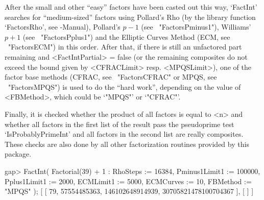 After the small and other ``easy'' factors have been casted out 
this way, `FactInt' searches for ``medium-sized'' factors using
Pollard's Rho (by the library function `FactorsRho',
see {\GAP}-Manual),
Pollard's $p-1$ (see ~"FactorsPminus1"), Williams' $p+1$ 
(see ~"FactorsPplus1") and the Elliptic Curves Method 
(ECM, see ~"FactorsECM") in this order.
After that, if there is still an unfactored part remaining and
<FactIntPartial> = false (or the remaining composites do not
exceed the bound given by <CFRACLimit> resp. <MPQSLimit>), 
one of the factor base methods (CFRAC, see ~"FactorsCFRAC" or 
MPQS, see ~"FactorsMPQS") is used to do the ``hard work'', depending
on the value of <FBMethod>, which could be `"MPQS"' or `"CFRAC"'.

Finally, it is checked whether the product of all factors
is equal to <n> and whether all factors in the first list of the
result pass the {\GAP} pseudoprime test `IsProbablyPrimeInt'
and all factors in the second list are really composites.
These checks are also done by all other factorization routines
provided by this package.  

\beginexample
gap> FactInt( Factorial(39) + 1 : RhoSteps := 16384, Pminus1Limit1 := 100000,
              Pplus1Limit1 := 2000, ECMLimit1 := 5000, ECMCurves := 10,
              FBMethod := "MPQS" );
[ [ 79, 57554485363, 146102648914939, 30705821478100704367 ], [  ] ]
\endexample

